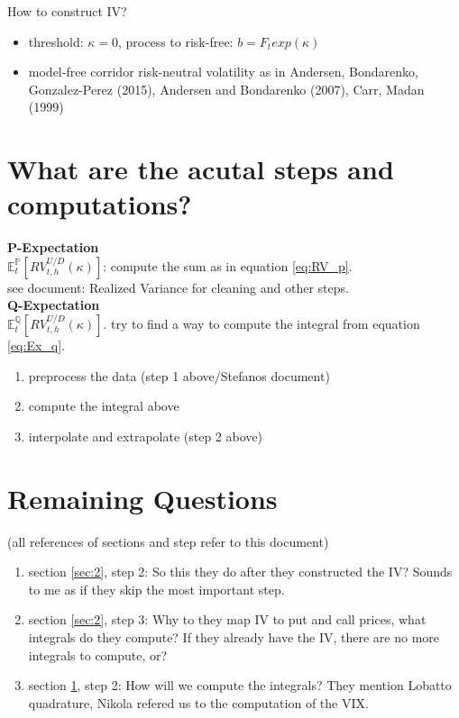 \documentclass{article}
\begin{document}
How to construct IV?
\begin{itemize}
\item threshold: $\kappa = 0$, process to risk-free: $b = F_{t}exp(\kappa)$
\item model-free corridor risk-neutral volatility as in Andersen, Bondarenko, Gonzalez-Perez (2015), Andersen and Bondarenko (2007), Carr, Madan (1999)
\end{itemize}


\section{What are the acutal steps and computations?}\label{sec:3}

\textbf{P-Expectation}\\

$\mathbb{E}_{t}^{\mathbb{P}} \left[ RV_{t,h}^{U/D} (\kappa) \right] $: compute the sum as in equation \ref{eq:RV_p}.\\

see document: Realized Variance for cleaning and other steps.\\

\textbf{Q-Expectation}\\

$\mathbb{E}_{t}^{\mathbb{Q}} \left[ RV_{t,h}^{U/D} (\kappa) \right]$. try to find a way to compute the integral from equation \ref{eq:Ex_q}.\\

\begin{enumerate}
\item preprocess the data (step 1 above/Stefanos document)
\item compute the integral above
\item interpolate and extrapolate (step 2 above)

\end{enumerate}

\section{Remaining Questions}
(all references of sections and step refer to this document)
\begin{enumerate}
\item section \ref{sec:2}, step 2: So this they do after they constructed the IV? Sounds to me as if they skip the most important step.
\item section \ref{sec:2}, step 3: Why to they map IV to put and call prices, what integrals do they compute? If they already have the IV, there are no more integrals to compute, or?
\item section \ref{sec:3}, step 2: How will we compute the integrals? They mention Lobatto quadrature, Nikola refered us to the computation of the VIX.
\end{enumerate}
\end{document}
